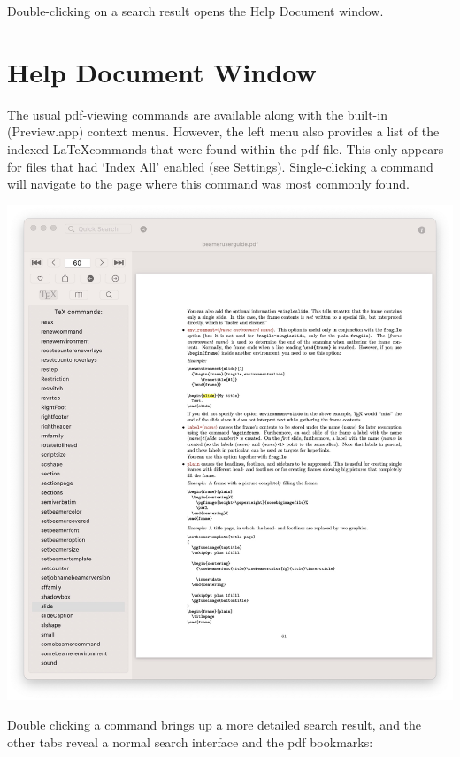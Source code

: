 \documentclass[11pt,a4paper]{article}
\begin{document}
Double-clicking on a search result opens the Help Document window.
\newpage
\section{Help Document Window}
The usual pdf-viewing commands are available along with the built-in (Preview.app) context menus. However, the left menu also provides a list of the indexed \LaTeX commands that were found within the pdf file. This only appears for files that had `Index All' enabled (see Settings). Single-clicking a command will navigate to the page where this command was most commonly found. 

\includegraphics[scale=0.2]{HelpDoc.jpg}

Double clicking a command brings up a more detailed search result, and the other tabs reveal a normal search interface and the pdf bookmarks:
\end{document}
